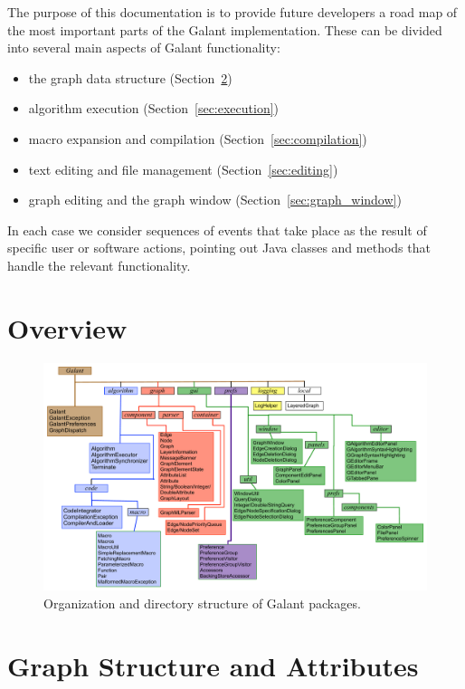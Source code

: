 The purpose of this documentation is to provide future developers a
road map of the most important parts of the Galant implementation. These can
be divided into several main aspects of Galant functionality:
\begin{itemize}
\item the graph data structure (Section~\ref{sec:graph_structure})
\item algorithm execution (Section~\ref{sec:execution})
\item macro expansion and compilation (Section~\ref{sec:compilation})
\item text editing and file management (Section~\ref{sec:editing})
\item graph editing and the graph window (Section~\ref{sec:graph_window})
\end{itemize}
In each case we consider sequences of events that take place as the result of
specific user or software actions, pointing out Java classes and methods that
handle the relevant functionality.

\section{Overview}

\begin{figure}
  \includegraphics[width=\textwidth]{Developer/X-overview}

  \medskip
  \caption{Organization and directory structure of Galant packages.}
  \label{fig:overview}
\end{figure}



\section{Graph Structure and Attributes} \label{sec:graph_structure}


